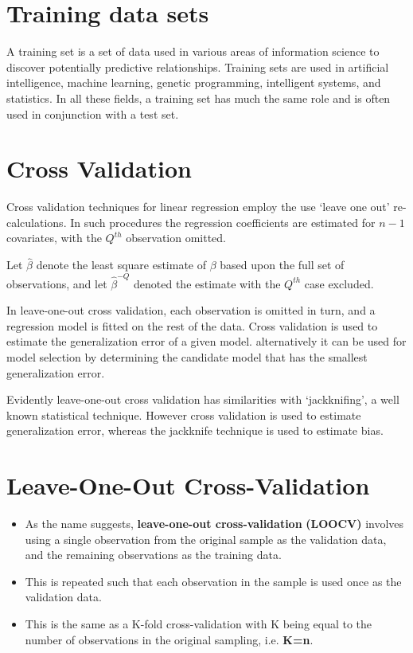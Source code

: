 \documentclass[a4paper,12pt]{article}
\begin{document}
\section{Training data sets}

A training set is a set of data used in various areas of information science to discover potentially predictive relationships. Training sets are used in artificial intelligence, machine learning, genetic programming, intelligent systems, and statistics. In all these fields, a training set has much the same role and is often used in conjunction with a test set.


\section{Cross Validation} %


Cross validation techniques for linear regression employ the use `leave one out' re-calculations. In such procedures the regression coefficients are estimated for $n-1$ covariates, with the $Q^{th}$ observation omitted.


Let $\hat{\beta}$ denote the least square estimate of $\beta$ based upon the full set of observations, and let
$\hat{\beta}^{-Q}$ denoted the estimate with the $Q^{th}$ case
excluded.




In leave-one-out cross validation, each observation is omitted in turn, and a regression model is fitted on the rest of the data. Cross validation is used to estimate the generalization error of a given model. alternatively it can be used for model selection by determining the candidate model that has the smallest generalization error.




Evidently leave-one-out cross validation has similarities with `jackknifing', a well known statistical technique. However cross validation is used to estimate generalization error, whereas the jackknife technique is used to estimate bias.

\section*{Leave-One-Out Cross-Validation}
\begin{itemize}
	\item As the name suggests, \textbf{leave-one-out cross-validation}  \textbf{(LOOCV)} involves using a single observation from the original sample as the validation data, and the remaining observations as the training data. 
	\item This is repeated such that each observation in the sample is used once as the validation data. 
	\item This is the same as a K-fold cross-validation with K being equal to the number of observations in the original sampling, i.e. \textbf{K=n}.
\end{itemize}
\end{document}
